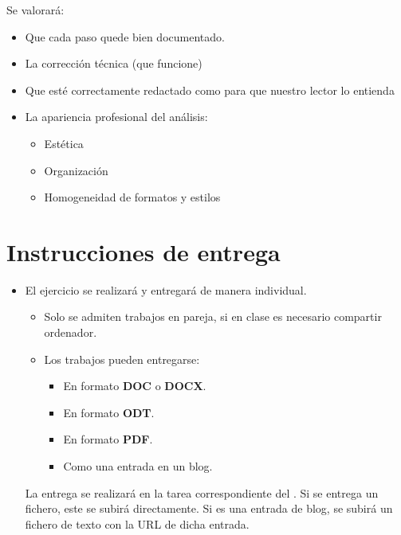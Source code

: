 Se valorará:
\begin{itemize}
\item Que cada paso quede bien documentado. 
\item La corrección técnica (que funcione)
\item Que esté correctamente redactado como para que nuestro lector lo entienda
\item La apariencia profesional del análisis:
  \begin{itemize}
  \item Estética
  \item Organización
  \item Homogeneidad de formatos y estilos
  \end{itemize}
\end{itemize}

\section{Instrucciones de entrega}
\begin{itemize}
\item El ejercicio se realizará y entregará de manera individual.
  \begin{itemize}
  \item Solo se admiten trabajos en pareja, si en clase es necesario compartir ordenador.


  \item Los trabajos pueden entregarse:
    \begin{itemize}
    \item En formato \textbf{DOC} o \textbf{DOCX}.
    \item En formato \textbf{ODT}.
    \item En formato \textbf{PDF}. 
    \item Como una entrada en un blog.  
    \end{itemize}
  \end{itemize}

  La entrega se realizará en la tarea correspondiente del . Si se entrega un fichero, este se subirá directamente. Si es una entrada de blog, se subirá un fichero de texto con la URL de dicha entrada.

  
\end{itemize}

